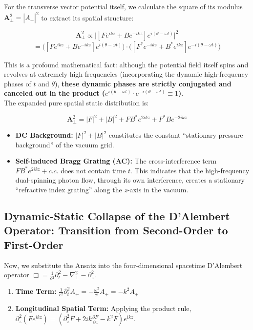 \documentclass[12pt, a4paper]{article}
\begin{document}
For the transverse vector potential itself, we calculate the square of its modulus $\mathbf{A}_\perp^2 = |A_+|^2$ to extract its spatial structure:

\begin{equation}
\mathbf{A}_\perp^2 \propto \Big| [F e^{ikz} + B e^{-ikz}] e^{i(\theta - \omega t)} \Big|^2 
\end{equation}
\begin{equation}
= \Big( [F e^{ikz} + B e^{-ikz}] e^{i(\theta - \omega t)} \Big) \cdot \Big( [F^* e^{-ikz} + B^* e^{ikz}] e^{-i(\theta - \omega t)} \Big) 
\end{equation}

This is a profound mathematical fact: although the potential field itself spins and revolves at extremely high frequencies (incorporating the dynamic high-frequency phases of $t$ and $\theta$), \textbf{these dynamic phases are strictly conjugated and canceled out in the product ($e^{i(\theta - \omega t)} \cdot e^{-i(\theta - \omega t)} \equiv 1$)}.\\
The expanded pure spatial static distribution is:

\begin{equation}
\mathbf{A}_\perp^2 = |F|^2 + |B|^2 + F B^* e^{2ikz} + F^* B e^{-2ikz} 
\end{equation}

\begin{itemize}
    \item \textbf{DC Background:} $|F|^2 + |B|^2$ constitutes the constant ``stationary pressure background'' of the vacuum grid.
    \item \textbf{Self-induced Bragg Grating (AC):} The cross-interference term $F B^* e^{2ikz} + c.c.$ does not contain time $t$. This indicates that the high-frequency dual-spinning photon flow, through its own interference, creates a stationary ``refractive index grating'' along the $z$-axis in the vacuum.
\end{itemize}

\subsection{Dynamic-Static Collapse of the D'Alembert Operator: Transition from Second-Order to First-Order}

Now, we substitute the Ansatz into the four-dimensional spacetime D'Alembert operator $\Box = \frac{1}{c^2}\partial_t^2 - \nabla_\perp^2 - \partial_z^2$.

\begin{enumerate}
    \item \textbf{Time Term:} $\frac{1}{c^2}\partial_t^2 A_+ = -\frac{\omega^2}{c^2} A_+ = -k^2 A_+$
    \item \textbf{Longitudinal Spatial Term:} Applying the product rule, $\partial_z^2 (F e^{ikz}) = (\partial_z^2 F + 2ik \frac{\partial F}{\partial z} - k^2 F) e^{ikz}$.
\end{enumerate}
\end{document}
